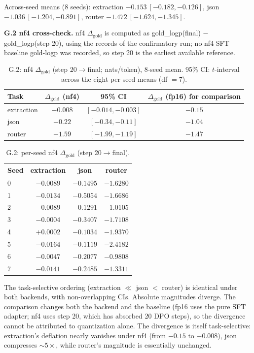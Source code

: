 Across-seed means (8 seeds): extraction $-0.153\ [-0.182,-0.126]$, json $-1.036\ [-1.204,-0.891]$, router $-1.472\ [-1.624,-1.345]$.

\textbf{G.2 nf4 cross-check.} nf4 $\Delta_{\text{gold}}$ is computed as gold\_logp(final) $-$ gold\_logp(step 20), using the records of the confirmatory run; no nf4 SFT baseline gold-logp was recorded, so step 20 is the earliest available reference.

\begin{table}[H]
\centering
\small
\caption{G.2: nf4 $\Delta_{\text{gold}}$ (step 20$\to$final; nats/token), 8-seed mean. 95\% CI: $t$-interval across the eight per-seed means (df $= 7$).}
\begin{tabular}{@{}lccc@{}}
\toprule
Task & $\Delta_{\text{gold}}$ (nf4) & 95\% CI & $\Delta_{\text{gold}}$ (fp16) for comparison\\
\midrule
extraction & $-0.008$ & $[-0.014,-0.003]$ & $-0.15$\\
json & $-0.22$ & $[-0.34,-0.11]$ & $-1.04$\\
router & $-1.59$ & $[-1.99,-1.19]$ & $-1.47$\\
\bottomrule
\end{tabular}
\end{table}

\begin{table}[H]
\centering
\small
\caption{G.2: per-seed nf4 $\Delta_{\text{gold}}$ (step 20$\to$final).}
\begin{tabular}{@{}lccc@{}}
\toprule
Seed & extraction & json & router\\
\midrule
0 & $-0.0089$ & $-0.1495$ & $-1.6280$\\
1 & $-0.0134$ & $-0.5054$ & $-1.6686$\\
2 & $-0.0089$ & $-0.1291$ & $-1.0105$\\
3 & $-0.0004$ & $-0.3407$ & $-1.7108$\\
4 & $+0.0002$ & $-0.1034$ & $-1.9370$\\
5 & $-0.0164$ & $-0.1119$ & $-2.4182$\\
6 & $-0.0047$ & $-0.2077$ & $-0.9808$\\
7 & $-0.0141$ & $-0.2485$ & $-1.3311$\\
\bottomrule
\end{tabular}
\end{table}

The task-selective ordering (extraction $\ll$ json $<$ router) is identical under both backends, with non-overlapping CIs. Absolute magnitudes diverge. The comparison changes both the backend and the baseline (fp16 uses the pure SFT adapter; nf4 uses step 20, which has absorbed 20 DPO steps), so the divergence cannot be attributed to quantization alone. The divergence is itself task-selective: extraction's deflation nearly vanishes under nf4 (from $-0.15$ to $-0.008$), json compresses ${\sim}5\times$, while router's magnitude is essentially unchanged.

